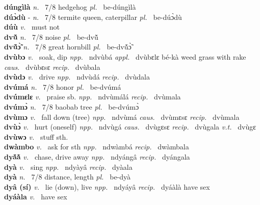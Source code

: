 {\bfseries dúngìlà}  {\itshape n.~} 7/8 hedgehog {\itshape pl.~} be-dúngìlà    \\ 
{\bfseries dúɔ̀dù} - {\itshape n.~} 7/8 termite queen, caterpillar {\itshape pl.~} be-dúɔ̀dù    \\ 
{\bfseries dúù}  {\itshape v.~} must not    \\ 
{\bfseries dvũ̌}  {\itshape n.~} 7/8 noise {\itshape pl.~} be-dvũ̌    \\ 
{\bfseries dvṹɔ̃̀}  {\itshape n.~} 7/8 great hornbill {\itshape pl.~} be-dvṹɔ̃̀    \\ 
{\bfseries dvùbɔ}  {\itshape v.~} soak, dip   {\itshape npp.~} ndvùbá {\itshape appl.~} dvùbɛlɛ bé-kà weed grass with rake {\itshape caus.~} dvùbɛsɛ {\itshape recip.~} dvùbala  \\ 
{\bfseries dvùdɔ}  {\itshape v.~} drive   {\itshape npp.~} ndvùdá {\itshape recip.~} dvùdala  \\ 
{\bfseries dvúmá}  {\itshape n.~} 7/8 honor {\itshape pl.~} be-dvúmá    \\ 
{\bfseries dvúmɛlɛ}  {\itshape v.~} praise sb.   {\itshape npp.~} ndvùmálá {\itshape recip.~} dvùmala  \\ 
{\bfseries dvúmɔ̀}  {\itshape n.~} 7/8 baobab tree {\itshape pl.~} be-dvúmɔ̀    \\ 
{\bfseries dvùmɔ}  {\itshape v.~} fall down (tree)   {\itshape npp.~} ndvùmá {\itshape caus.~} dvùmɛsɛ {\itshape recip.~} dvùmala  \\ 
{\bfseries dvùɔ̀}  {\itshape v.~} hurt (oneself)   {\itshape npp.~} ndvùgá {\itshape caus.~} dvùgɛsɛ {\itshape recip.~} dvùgala {\itshape v.t.~} dvùgɛ \\ 
{\bfseries dvùwɔ}  {\itshape v.~} stuff sth.    \\ 
{\bfseries dwàmbo}  {\itshape v.~} ask for sth   {\itshape npp.~} ndwàmbá {\itshape recip.~} dwàmbala  \\ 
{\bfseries dyã́ã̀}  {\itshape v.~} chase, drive away   {\itshape npp.~} ndyángâ {\itshape recip.~} dyángala\\ 
{\bfseries dyà}  {\itshape v.~} sing   {\itshape npp.~} ndyàyâ {\itshape recip.~} dyàala  \\ 
{\bfseries dyà}  {\itshape n.~} 7/8 distance, length {\itshape pl.~} be-dyà    \\ 
{\bfseries dyâ (sí)}  {\itshape v.~} lie (down), live   {\itshape npp.~} ndyáyâ {\itshape recip.~} dyáàlà have sex  \\ 
{\bfseries dyáàla}  {\itshape v.~} have sex    \\ 
